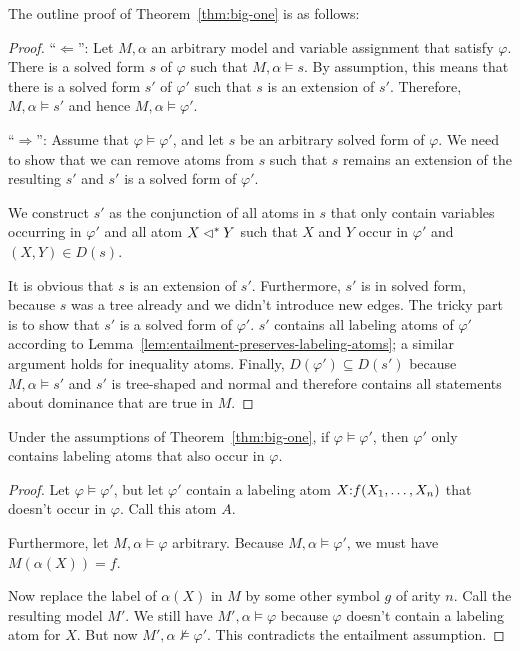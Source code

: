 The outline proof of Theorem~\ref{thm:big-one} is as follows:
\begin{proof}
  ``$\Leftarrow$'': Let $M,\alpha$ an arbitrary model and variable
  assignment that satisfy $\varphi$.  There is a solved form $s$ of
  $\varphi$ such that $M,\alpha \models s$.  By assumption, this means
  that there is a solved form $s'$ of $\varphi'$ such that $s$ is an
  extension of $s'$.  Therefore, $M,\alpha \models s'$ and hence
  $M,\alpha \models \varphi'$.

  ``$\Rightarrow$'': Assume that $\varphi \models \varphi'$, and let
  $s$ be an arbitrary solved form of $\varphi$.  We need to show that
  we can remove atoms from $s$ such that $s$ remains an extension of
  the resulting $s'$ and $s'$ is a solved form of $\varphi'$.

  We construct $s'$ as the conjunction of all atoms in $s$ that only
  contain variables occurring in $\varphi'$ and all atom $X \lhd^* Y$
  such that $X$ and $Y$ occur in $\varphi'$ and $(X,Y) \in D(s)$.

  It is obvious that $s$ is an extension of $s'$.  Furthermore, $s'$
  is in solved form, because $s$ was a tree already and we didn't
  introduce new edges.  The tricky part is to show that $s'$ is a
  solved form of $\varphi'$.  $s'$ contains all labeling atoms of
  $\varphi'$ according to
  Lemma~\ref{lem:entailment-preserves-labeling-atoms}; a similar
  argument holds for inequality atoms.  Finally, $D(\varphi')
  \subseteq D(s')$ because $M,\alpha \models s'$ and $s'$ is
  tree-shaped and normal and therefore contains all statements about
  dominance that are true in $M$.
\end{proof}

\begin{lemma} \label{lem:entailment-preserves-labeling-atoms}
  Under the assumptions of
  Theorem~\ref{thm:big-one}, if $\varphi \models
  \varphi'$, then $\varphi'$ only contains labeling atoms that also
  occur in $\varphi$.  
\end{lemma}
\begin{proof}
  Let $\varphi \models \varphi'$, but let $\varphi'$ contain a
  labeling atom $X {:} f(X_1,\ldots,X_n)$ that doesn't occur in
  $\varphi$.  Call this atom $A$.

  Furthermore, let $M,\alpha \models \varphi$ arbitrary.  Because
  $M,\alpha \models \varphi'$, we must have $M(\alpha(X)) = f$.

  Now replace the label of $\alpha(X)$ in $M$ by some other symbol $g$
  of arity $n$.  Call the resulting model $M'$.  We still have
  $M',\alpha \models \varphi$ because $\varphi$ doesn't contain a
  labeling atom for $X$.  But now $M',\alpha \not\models \varphi'$.
  This contradicts the entailment assumption.
\end{proof}

